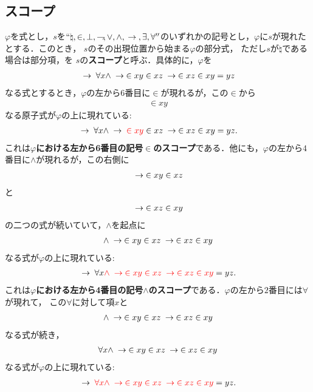 \subsection{スコープ}
	$\varphi$を式とし，$s$を$``\natural,\in,\bot,\negation,\vee,\wedge,
	\rarrow,\exists,\forall''$のいずれかの記号とし，$\varphi$に$s$が現れたとする．このとき，
	$s$のその出現位置から始まる$\varphi$の部分式，
	ただし$s$が$\natural$である場合は部分項，を
	$s$の{\bf スコープ}と呼ぶ．具体的に，$\varphi$を
	\begin{align}
		\rarrow \forall x \wedge \rarrow \in xy \in xz \rarrow \in xz \in xy = yz
	\end{align}
	なる式とするとき，$\varphi$の左から$6$番目に$\in$が現れるが，この$\in$から
	\begin{align}
		\in xy
	\end{align}
	なる原子式が$\varphi$の上に現れている:
	\begin{align}
		\rarrow \forall x \wedge \rarrow \textcolor{red}{\in xy} \in xz \rarrow \in xz \in xy = yz.
	\end{align}
	これは{\bf $\varphi$における左から6番目の記号$\in$のスコープ}である．他にも，$\varphi$の左から$4$番目に$\wedge$が現れるが，この右側に
	\begin{align}
		\rarrow \in xy \in xz
	\end{align}
	と
	\begin{align}
		\rarrow \in xz \in xy
	\end{align}
	の二つの式が続いていて，$\wedge$を起点に
	\begin{align}
		\wedge \rarrow \in xy \in xz \rarrow \in xz \in xy
	\end{align}
	なる式が$\varphi$の上に現れている:
	\begin{align}
		\rarrow \forall x \textcolor{red}{\wedge \rarrow \in xy \in xz \rarrow \in xz \in xy} = yz.
	\end{align}
	これは{\bf $\varphi$における左から4番目の記号$\wedge$のスコープ}である．$\varphi$の左から$2$番目には$\forall$が現れて，
	この$\forall$に対して項$x$と
	\begin{align}
		\wedge \rarrow \in xy \in xz \rarrow \in xz \in xy
	\end{align}
	なる式が続き，
	\begin{align}
		\forall x \wedge \rarrow \in xy \in xz \rarrow \in xz \in xy
	\end{align}
	なる式が$\varphi$の上に現れている:
	\begin{align}
		\rarrow \textcolor{red}{\forall x \wedge \rarrow \in xy \in xz \rarrow \in xz \in xy} = yz.
	\end{align}
	
